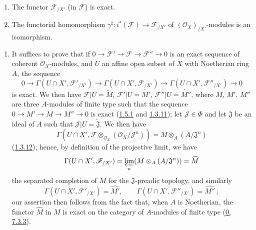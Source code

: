 \begin{proposition}[10.8.8]
\label{I.10.8.8}
\medskip\noindent
\begin{enumerate}
  \item[\rm{(i)}] The functor $\mathscr{F}_{/X'}$ (in $\mathscr{F}$) is
    exact.
  \item[\rm{(ii)}] The functorial homomorphism
    $\gamma^\sharp:i^*(\mathscr{F})\to\mathscr{F}_{/X'}$ of
    $(\mathscr{O}_X)_{/X'}$-modules is an isomorphism.
\end{enumerate}
\end{proposition}

\medskip\noindent
\begin{enumerate}
  \item[\rm{(i)}] It suffices to prove that if
    $0\to\mathscr{F}'\to\mathscr{F}\to\mathscr{F}''\to0$ is an exact
    sequence of coherent $\mathscr{O}_X$-modules, and $U$ an affine
    open subset of $X$ with Noetherian ring $A$, the sequence
    \[
      0\to\Gamma(U\cap X',\mathscr{F}'_{/X'})
      \to\Gamma(U\cap X',\mathscr{F}_{/X'})
      \to\Gamma(U\cap X',\mathscr{F}''_{/X'})\to0
    \]
    is exact. We then have $\mathscr{F}|U=\widetilde M$,
    $\mathscr{F}'|U=\widetilde{M'}$, $\mathscr{F}''|U=\widetilde{M''}$,
    where $M$, $M'$, $M''$ are three $A$-modules of finite type such that
    the sequence $0\to M'\to M\to M''\to0$ is exact
    (\hyperref[I.1.5.1]{1.5.1} and
    \hyperref[I.1.3.11]{1.3.11}); let $\mathscr{J}\in\Phi$ and let
    $\mathfrak{J}$ be an ideal of $A$ such that
    $\mathscr{J}|U=\widetilde{\mathfrak{J}}$. We then have
    \[
      \Gamma(U\cap X',
      \mathscr{F}\otimes_{\mathscr{O}_X}(\mathscr{O}_X/\mathscr{J}^n))
      =M\otimes_A(A/\mathfrak{J}^n)
    \]
    (\hyperref[I.1.3.12]{1.3.12}); hence, by definition of the
    projective limit, we have
    \[
      \Gamma(U\cap X',\mathscr{F}_{/X'})
      =\varprojlim_n(M\otimes_A(A/\mathfrak{J}^n))=\widehat M
    \]
    the separated completion of $M$ for the $\mathfrak{J}$-preadic
    topology, and similarly
    \[
      \Gamma(U\cap X',\mathscr{F}'_{/X'})=\widehat{M'},\qquad
      \Gamma(U\cap X',\mathscr{F}''_{/X'})=\widehat{M''}~;
    \]
    our assertion then follows from the fact that, when $A$ is
    Noetherian, the functor $\widehat M$ in $M$ is exact on the category
    of $A$-modules of finite type (\hyperref[0.7.3.3]{0, 7.3.3}).


\end{enumerate}

